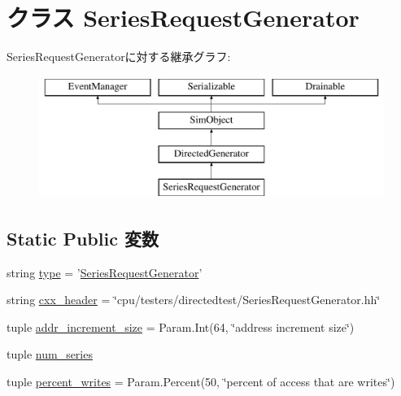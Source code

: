 \hypertarget{classRubyDirectedTester_1_1SeriesRequestGenerator}{
\section{クラス SeriesRequestGenerator}
\label{classRubyDirectedTester_1_1SeriesRequestGenerator}
}
SeriesRequestGeneratorに対する継承グラフ:\begin{figure}[H]
\begin{center}
\leavevmode
\includegraphics[height=4cm]{classRubyDirectedTester_1_1SeriesRequestGenerator}
\end{center}
\end{figure}
\subsection*{Static Public 変数}
\begin{DoxyCompactItemize}
\item 
string \hyperlink{classRubyDirectedTester_1_1SeriesRequestGenerator_acce15679d830831b0bbe8ebc2a60b2ca}{type} = '\hyperlink{classRubyDirectedTester_1_1SeriesRequestGenerator}{SeriesRequestGenerator}'
\item 
string \hyperlink{classRubyDirectedTester_1_1SeriesRequestGenerator_a17da7064bc5c518791f0c891eff05fda}{cxx\_\-header} = \char`\"{}cpu/testers/directedtest/SeriesRequestGenerator.hh\char`\"{}
\item 
tuple \hyperlink{classRubyDirectedTester_1_1SeriesRequestGenerator_a55a1d04584c3ff8e876c814204071ea5}{addr\_\-increment\_\-size} = Param.Int(64, \char`\"{}address increment size\char`\"{})
\item 
tuple \hyperlink{classRubyDirectedTester_1_1SeriesRequestGenerator_a01985ee594e57cc1f439c360d5ef908f}{num\_\-series}
\item 
tuple \hyperlink{classRubyDirectedTester_1_1SeriesRequestGenerator_af2b9cffec9f111436112603e85ff7b25}{percent\_\-writes} = Param.Percent(50, \char`\"{}percent of access that are writes\char`\"{})
\end{DoxyCompactItemize}


